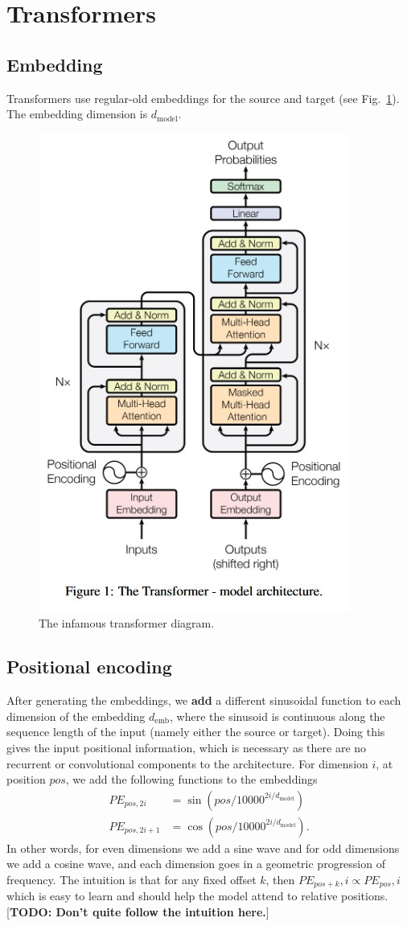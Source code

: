 \documentclass[11pt]{article}
\numberwithin{equation}{section}
\begin{document}
\newcommand{\dmodel}{d_{\text{model}}}

\section{Transformers}


\subsection{Embedding}
Transformers \citep{Vaswani17} use regular-old embeddings for the source and target (see Fig.~\ref{fig:tfm}). The embedding dimension is $\dmodel$.

\begin{figure}
\begin{center}
\includegraphics[width=0.4\columnwidth]{../figures/transformer.jpg}  
\end{center}
\caption{The infamous transformer diagram.}
\label{fig:tfm}
\end{figure}

\newcommand{\demb}{d_{\text{emb}}}
\subsection{Positional encoding}
After generating the embeddings, we \textbf{add} a different sinusoidal function to each dimension of the embedding $\demb$, where the sinusoid is continuous along the sequence length of the input (namely either the source or target). Doing this gives the input positional information, which is necessary as there are no recurrent or convolutional components to the architecture. For dimension $i$, at position $pos$, we add the following functions to the embeddings
\begin{align}
PE_{pos, 2i} &= \sin\left(pos/10000^{2i/\dmodel}\right) \\
PE_{pos, 2i+1} &= \cos\left(pos/10000^{2i/\dmodel}\right). 
\end{align}
In other words, for even dimensions we add a sine wave and for odd dimensions we add a cosine wave, and each dimension goes in a geometric progression of frequency. The intuition is that for any fixed offset $k$, then $PE_{pos+k},i \propto PE_{pos},i$ which is easy to learn and should help the model attend to relative positions. [\textbf{TODO: Don't quite follow the intuition here.}]
\end{document}
